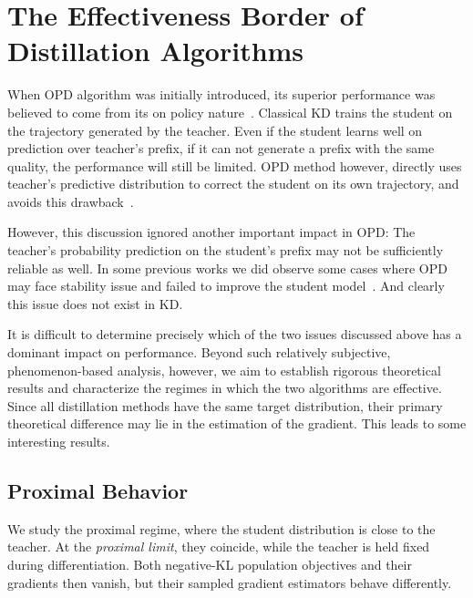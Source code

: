 \section{The Effectiveness Border of Distillation Algorithms}

When OPD algorithm was initially introduced, its superior performance was believed to come from its on policy nature~\citep{thinking_machines_lab_-policy_2025}. Classical KD trains the student on the trajectory generated by the teacher. Even if the student learns well on prediction over teacher's prefix, if it can not generate a prefix with the same quality, the performance will still be limited. OPD method however, directly uses teacher's predictive distribution to correct the student on its own trajectory, and avoids this drawback~\citep{thinking_machines_lab_-policy_2025}.

However, this discussion ignored another important impact in OPD: The teacher's probability prediction on the student's prefix may not be sufficiently reliable as well. In some previous works we did observe some cases where OPD may face stability issue and failed to improve the student model~\citep{li_rethinking_2026}. And clearly this issue does not exist in KD.

It is difficult to determine precisely which of the two issues discussed above has a dominant impact on performance. Beyond such relatively subjective, phenomenon-based analysis, however, we aim to establish rigorous theoretical results and characterize the regimes in which the two algorithms are effective. Since all distillation methods have the same target distribution, their primary theoretical difference may lie in the estimation of the gradient. This leads to some interesting results.

\subsection{Proximal Behavior}

We study the proximal regime, where the student distribution is close to
the teacher. At the \emph{proximal limit}, they coincide, while the teacher
is held fixed during differentiation. Both negative-KL population
objectives and their gradients then vanish, but their sampled gradient
estimators behave differently.

